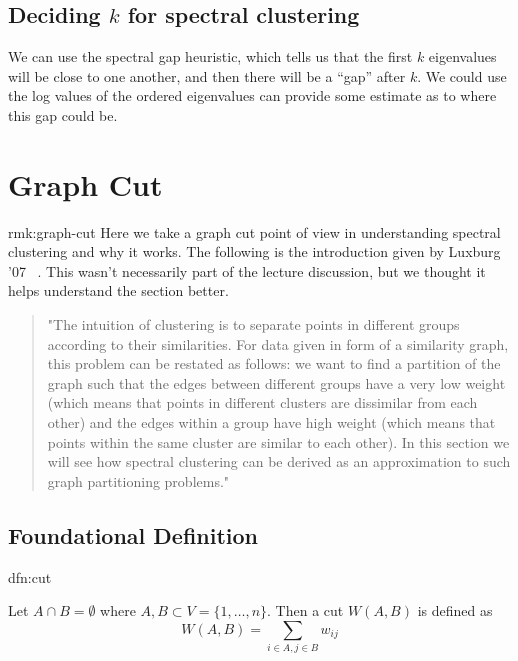 \documentclass[12pt]{article}
\theoremstyle{plain}
\begin{document}
\subsection{Deciding $ k $ for spectral clustering}

We can use the spectral gap heuristic, which tells us that the first $ k $ eigenvalues will be close to one another, and then there will be a ``gap'' after $ k $.
We could use the log values of the ordered eigenvalues can provide some estimate as to where this gap could be.

\section{Graph Cut}

\begin{rmk}{rmk:graph-cut}
Here we take a graph cut point of view in understanding spectral clustering and why it works. The following is the introduction given by Luxburg '07 ~\cite{luxburg-2007}. This wasn't necessarily part of the lecture discussion, but we thought it helps understand the section better.
\end{rmk}

\begin{quote}
"The intuition of clustering is to separate points in different groups according to their similarities. For data given in form of a similarity graph, this problem can be restated as follows: we want to find a partition of the graph such that the edges between different groups have a very low weight (which means that points in different clusters are dissimilar from each other) and the edges within a group have high weight (which means that points within the same cluster are similar to each other). In this section we will see how spectral clustering can be derived as an approximation to such graph partitioning problems."~\cite{luxburg-2007}
\end{quote}

\subsection{Foundational Definition}

\begin{dfn}[Cut]{dfn:cut}

Let $ A \cap B = \emptyset $ where $ A, B \subset V = \{ 1, \ldots, n \} $.
Then a cut $ W(A, B) $ is defined as
\[
W(A, B) = \sum_{i \in A, j \in B} w_{ij}
\]

\end{dfn}
\end{document}
